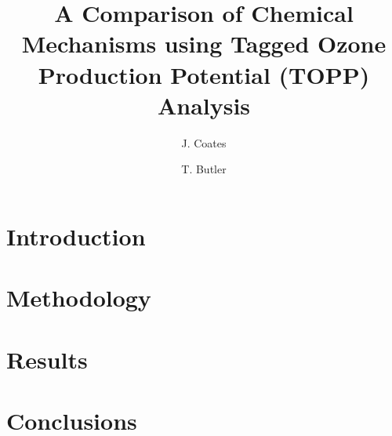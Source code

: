 \documentclass[11pt,a4paper]{article}
\title{A Comparison of Chemical Mechanisms using Tagged Ozone Production Potential (TOPP) Analysis}
\author[1]{J. Coates}%
\author[1]{T. Butler}
\affil[1]{Institute for Advanced Sustainability Studies, Potsdam, Germany}
\begin{document}
\maketitle

\begin{abstract}
    
\end{abstract}

\section{Introduction} \label{s:introduction}


\section{Methodology} \label{s:methodology}


\section{Results} \label{s:results}


\section{Conclusions} \label{s:conclusions}




 
\end{document}
